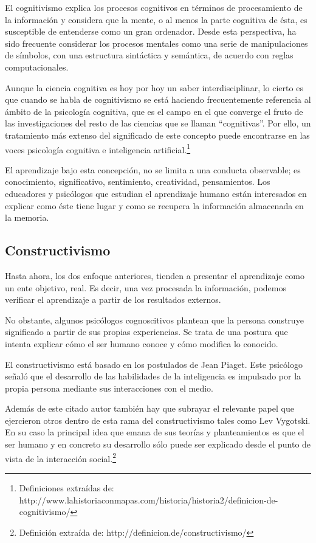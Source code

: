 El cognitivismo explica los procesos cognitivos en términos de procesamiento de
la información y considera que la mente, o al menos la parte cognitiva de ésta,
es susceptible de entenderse como un gran ordenador. Desde esta perspectiva, ha
sido frecuente considerar los procesos mentales como una serie de
manipulaciones de símbolos, con una estructura sintáctica y semántica, de
acuerdo con reglas computacionales.

Aunque la ciencia cognitiva es hoy por hoy un saber interdisciplinar, lo cierto
es que cuando se habla de cognitivismo se está haciendo frecuentemente
referencia al ámbito de la psicología cognitiva, que es el campo en el que
converge el fruto de las investigaciones del resto de las ciencias que se
llaman “cognitivas”. Por ello, un tratamiento más extenso del significado de
este concepto puede encontrarse en las voces psicología cognitiva e
inteligencia artificial.\footnote{Definiciones extraídas de:
http://www.lahistoriaconmapas.com/historia/historia2/definicion-de-cognitivismo/}

El aprendizaje bajo esta concepción, no se limita a una conducta observable; es
conocimiento, significativo, sentimiento, creatividad, pensamientos. Los 
educadores y psicólogos que estudian el aprendizaje humano están interesados en
explicar como éste tiene lugar y como se recupera la información almacenada en
la memoria.\cite{Rojas}

\subsection{Constructivismo}

Hasta ahora, los dos enfoque anteriores, tienden a presentar el aprendizaje
como un ente objetivo, real. Es decir, una vez procesada la información,
podemos verificar el aprendizaje a partir de los resultados externos.

No obstante, algunos psicólogos cognoscitivos plantean que la persona construye
significado a partir de sus propias experiencias. Se trata de una postura que
intenta explicar cómo el ser humano conoce y cómo modifica lo
conocido\cite{Rojas}.

El constructivismo está basado en los postulados de Jean Piaget. Este psicólogo
señaló que el desarrollo de las habilidades de la inteligencia es impulsado por
la propia persona mediante sus interacciones con el medio.

Además de este citado autor también hay que subrayar el relevante papel que
ejercieron otros dentro de esta rama del constructivismo tales como Lev
Vygotski. En su caso la principal idea que emana de sus teorías y 
planteamientos es que el ser humano y en concreto su desarrollo sólo puede ser
explicado desde el punto de vista de la interacción social.\footnote{Definición
extraída de: http://definicion.de/constructivismo/}

